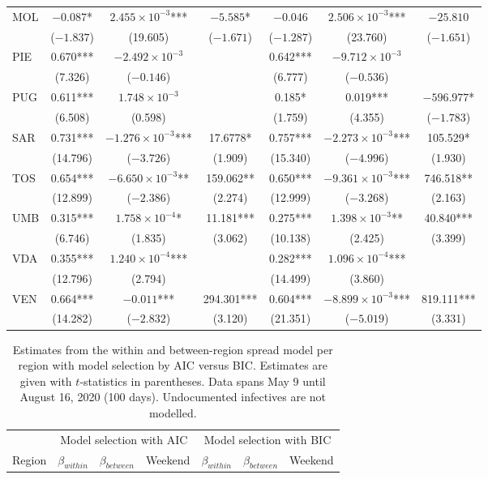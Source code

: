 \documentclass[12pt]{article}
\begin{document}
\begin{appendices}
\begin{longtable}{@{}lcccccc@{}}
            MOL & $-0.087$* & $2.455 \times 10^{-3}$*** & $-5.585$* & $-0.046$ & $2.506 \times 10^{-3}$*** & $-25.810$ \\ 
             & ($-1.837$) & (19.605) & ($-1.671$) & ($-1.287$) & (23.760) & ($-1.651$) \\ 
            PIE & 0.670*** & $-2.492 \times 10^{-3}$ &  & 0.642*** & $-9.712 \times 10^{-3}$ &  \\ 
             & (7.326) & ($-0.146$) &  & (6.777) & ($-0.536$) &  \\ 
            PUG & 0.611*** & $1.748 \times 10^{-3}$ &  & 0.185* & 0.019*** & $-596.977$* \\ 
             & (6.508) & (0.598) &  & (1.759) & (4.355) & ($-1.783$) \\ 
            SAR & 0.731*** & $-1.276 \times 10^{-3}$*** & 17.6778* & 0.757*** & $-2.273 \times 10^{-3}$*** & 105.529* \\ 
             & (14.796) & ($-3.726$) & (1.909) & (15.340) & ($-4.996$) & (1.930) \\ 
            TOS & 0.654*** & $-6.650 \times 10^{-3}$** & 159.062** & 0.650*** & $-9.361 \times 10^{-3}$*** & 746.518** \\ 
             & (12.899) & ($-2.386$) & (2.274) & (12.999) & ($-3.268$) & (2.163) \\ 
            UMB & 0.315*** & $1.758 \times 10^{-4}$* & 11.181*** & 0.275*** & $1.398 \times 10^{-3}$** & 40.840*** \\ 
             & (6.746) & (1.835) & (3.062) & (10.138) & (2.425) & (3.399) \\ 
            VDA & 0.355*** & $1.240 \times 10^{-4}$*** &  & 0.282*** & $1.096 \times 10^{-4}$*** &  \\ 
             & (12.796) & (2.794) &  & (14.499) & (3.860) &  \\ 
            VEN & 0.664*** & $-0.011$*** & 294.301*** & 0.604*** & $-8.899 \times 10^{-3}$*** & 819.111*** \\ 
             & (14.282) & ($-2.832$) & (3.120) & (21.351) & ($-5.019$) & (3.331) \\* \bottomrule
    	\end{longtable}
		
		\begin{longtable}{@{}lcccccc@{}}
    		\caption{Estimates from the within and between-region spread model per region with model selection by AIC versus BIC. Estimates are given with $t$-statistics in parentheses. Data spans May 9 until August 16, 2020 (100 days). Undocumented infectives are not modelled.}
    		\label{tab:results_between_aic_vs_bic}\\
    		\toprule
    		                & \multicolumn{3}{c}{Model selection with AIC} & \multicolumn{3}{c}{Model selection with BIC} \\
    		                \cmidrule(lr){2-4}
                            \cmidrule(lr){5-7}
    		Region          & $\beta_{within}$ & $\beta_{between}$ & Weekend & $\beta_{within}$ & $\beta_{between}$ & Weekend \\* \midrule
    		\endfirsthead
    		

\end{longtable}
\end{appendices}
\end{document}
